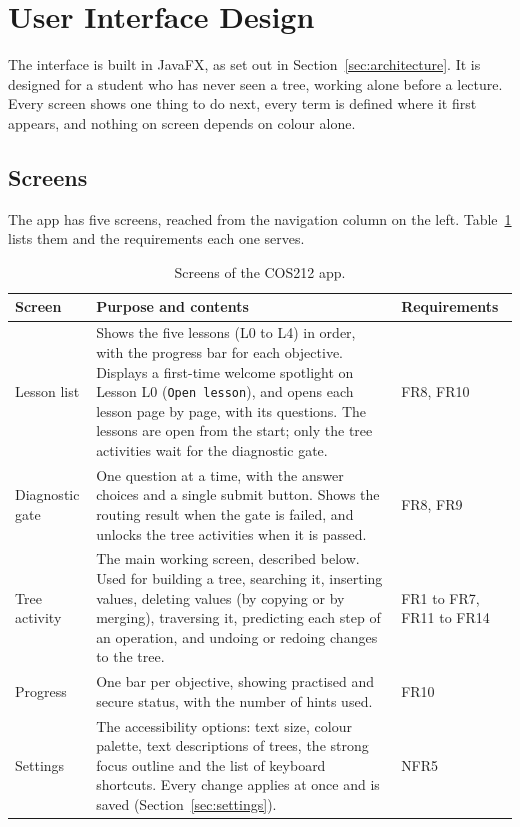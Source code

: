 \section{User Interface Design}\label{sec:ui}


The interface is built in JavaFX, as set out in Section~\ref{sec:architecture}. It is designed for a student who has never seen a tree, working alone before a lecture. Every screen shows one thing to do next, every term is defined where it first appears, and nothing on screen depends on colour alone.

\subsection{Screens}
The app has five screens, reached from the navigation column on the left. Table~\ref{tab:screens} lists them and the requirements each one serves.

\begin{table}[H]
\centering
\small
\caption{Screens of the COS212 app.}
\label{tab:screens}
\begin{tabularx}{\textwidth}{p{3.2cm} X p{2.4cm}}
\toprule
Screen & Purpose and contents & Requirements \\
\midrule
Lesson list & Shows the five lessons (L0 to L4) in order, with the progress bar for each objective. Displays a first-time welcome spotlight on Lesson L0 (\texttt{Open lesson}), and opens each lesson page by page, with its questions. The lessons are open from the start; only the tree activities wait for the diagnostic gate. & FR8, FR10 \\
Diagnostic gate & One question at a time, with the answer choices and a single submit button. Shows the routing result when the gate is failed, and unlocks the tree activities when it is passed. & FR8, FR9 \\
Tree activity & The main working screen, described below. Used for building a tree, searching it, inserting values, deleting values (by copying or by merging), traversing it, predicting each step of an operation, and undoing or redoing changes to the tree. & FR1 to FR7, FR11 to FR14 \\
Progress & One bar per objective, showing practised and secure status, with the number of hints used. & FR10 \\
Settings & The accessibility options: text size, colour palette, text descriptions of trees, the strong focus outline and the list of keyboard shortcuts. Every change applies at once and is saved (Section~\ref{sec:settings}). & NFR5 \\
\bottomrule
\end{tabularx}
\end{table}

